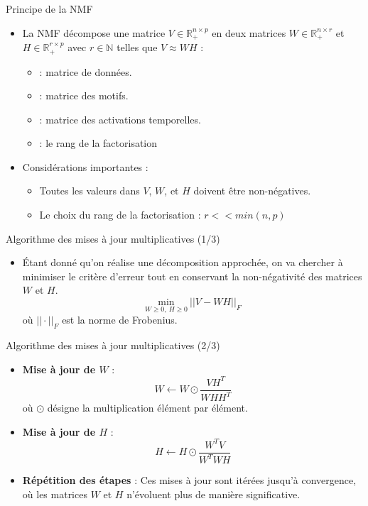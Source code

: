 \documentclass{beamer}
\begin{document}
\begin{frame}{Principe de la NMF}
    \begin{itemize}
        \item La NMF décompose une matrice $V \in \mathbb{R}^{n \times p}_+$ en deux matrices $W \in \mathbb{R}^{n \times r}_+$ et $H \in \mathbb{R}^{r \times p}_+$ avec $r \in \mathbb{N}$ telles que $V \approx WH$ :
        \begin{itemize}
            \item{ : matrice de données.}
            \item{ : matrice des motifs.}
            \item{ : matrice des activations temporelles.}
            \item{ : le rang de la factorisation}
        \end{itemize}
        \item Considérations importantes :
        \begin{itemize}
            \item Toutes les valeurs dans $V$, $W$, et $H$ doivent être non-négatives.
            \item Le choix du rang de la factorisation : $r << min(n,p)$
        \end{itemize}
    \end{itemize}
\end{frame}

\begin{frame}{Algorithme des mises à jour multiplicatives (1/3)}
    \begin{itemize}
        \item Étant donné qu'on réalise une décomposition approchée, on va chercher à minimiser le critère d'erreur tout en conservant la non-négativité des matrices $W$ et $H$.
            \[\displaystyle \underset{W \ge 0,\ H \ge 0}{\mathrm{min}} \ ||V - WH||_{F}\]
        où $||\cdot||_F$ est la norme de Frobenius.
    \end{itemize}
\end{frame}

\begin{frame}{Algorithme des mises à jour multiplicatives (2/3)}
    \begin{itemize}
        \item \textbf{Mise à jour de $W$} : 
        \[
        W \leftarrow W \odot \frac{VH^T}{WHH^T}
        \]
        où $\odot$ désigne la multiplication élément par élément.
        \item \textbf{Mise à jour de $H$} : 
        \[
        H \leftarrow H \odot \frac{W^TV}{W^TWH}
        \]
        \item \textbf{Répétition des étapes} : Ces mises à jour sont itérées jusqu'à convergence, où les matrices $W$ et $H$ n'évoluent plus de manière significative.
    \end{itemize}
\end{frame}
\end{document}
